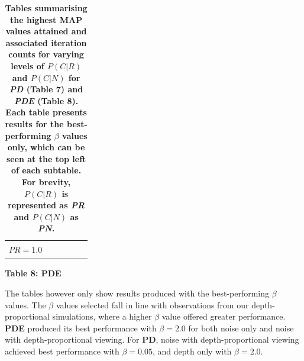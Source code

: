 \begin{table}
\begin{subtable}{\columnwidth}
\begin{small}
\begin{tabularx}{\columnwidth}{W{1.29cm}|W{1.29cm}|W{1.29cm}|W{1.29cm}|W{1.29cm}W{0.00000001cm}}
					& 
					& 
					& 
					& &
					\tabularnewline[1.4em]

					& 
					& 
					& 
					& &
					\tabularnewline[1.4em]

				\end{tabularx}
			\end{small}

		\caption*{\textbf{Table 8: PDE}}
		\label{tbl:noisy_pde}

	\end{subtable}
	
	\caption*{\textbf{Tables summarising the highest MAP values attained and associated iteration counts for varying levels of $P(C|R)$ and $P(C|N)$ for \emph{PD} (Table 7) and \emph{PDE} (Table 8). Each table presents results for the best-performing $\beta$ values only, which can be seen at the top left of each subtable. For brevity, $P(C|R)$ is represented as \emph{PR} and $P(C|N)$ as \emph{PN}.}}
	\label{tbl:noisy_pd_pde}
\end{table}

The tables however only show results produced with the best-performing $\beta$ values. The $\beta$ values selected fall in line with observations from our depth-proportional simulations, where a higher $\beta$ value offered greater performance. \textbf{PDE} produced its best performance with $\beta=2.0$ for both noise only and noise with depth-proportional viewing. For \textbf{PD}, noise with depth-proportional viewing achieved best performance with $\beta = 0.05$, and depth only with $\beta = 2.0$.


